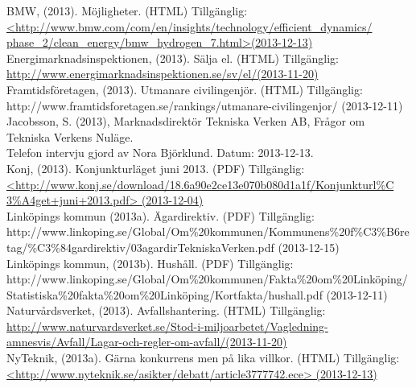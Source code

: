 \documentclass[10pt,a4paper]{article}
\begin{document}
\hspace{0,5cm}
BMW, (2013). Möjligheter. (HTML) Tillgänglig: \\
\hyperref{http://www.bmw.com/com/en/insights/technology/efficient_dynamics/phase_2/clean_energy/bmw_hydrogen_7.html}{}{}{<http://www.bmw.com/com/en/insights/technology/efficient\_dynamics/\\phase\_2/clean\_energy/bmw\_hydrogen\_7.html>(2013-12-13)}\\

Energimarknadsinspektionen, (2013). Sälja el. (HTML) Tillgänglig: \\
\hyperref{http://www.energimarknadsinspektionen.se/sv/el/}{}{}{http://www.energimarknadsinspektionen.se/sv/el/(2013-11-20)}\\

Framtidsföretagen, (2013). Utmanare civilingenjör. (HTML) Tillgänglig: \\
http://www.framtidsforetagen.se/rankings/utmanare-civilingenjor/ (2013-12-11)\\

Jacobsson, S. (2013), Marknadsdirektör Tekniska Verken AB, Frågor om
Tekniska Verkens Nuläge.\\
Telefon intervju gjord av Nora Björklund. Datum: 2013-12-13. \\

Konj, (2013). Konjunkturläget juni 2013. (PDF) Tillgänglig:\\
\hyperref{http://www.konj.se/download/18.6a90e2ce13e070b080d1a1f/Konjunkturl\%C3\%A4get+juni+2013.pdf}{}{}{<http://www.konj.se/download/18.6a90e2ce13e070b080d1a1f/Konjunkturl\%C\\3\%A4get+juni+2013.pdf> (2013-12-04)}\\

Linköpings kommun (2013a). Ägardirektiv. (PDF) Tillgänglig:\\
http://www.linkoping.se/Global/Om\%20kommunen/Kommunens\%20f\%C3\%B6retag/\%C3\%84gardirektiv/03agardirTekniskaVerken.pdf (2013-12-15)\\

Linköpings kommun, (2013b). Hushåll. (PDF) Tillgänglig:\\
http://www.linkoping.se/Global/Om\%20kommunen/Fakta\%20om\%20Linköping/\\Statistiska\%20fakta\%20om\%20Linköping/Kortfakta/hushall.pdf (2013-12-11)\\

Naturvårdsverket, (2013). Avfallshantering. (HTML) Tillgänglig: \\
\hyperref{http://www.naturvardsverket.se/Stod-i-miljoarbetet/Vagledning-amnesvis/Avfall/Lagar-och-regler-om-avfall/}{}{}{http://www.naturvardsverket.se/Stod-i-miljoarbetet/Vagledning-amnesvis/Avfall/Lagar-och-regler-om-avfall/(2013-11-20)}\\
NyTeknik, (2013a). Gärna konkurrens men på lika villkor. (HTML)
Tillgänglig: \\
\hyperref{http://www.nyteknik.se/asikter/debatt/article3777742.ece}{}{}{<http://www.nyteknik.se/asikter/debatt/article3777742.ece>
  (2013-12-13)}\\
\end{document}
